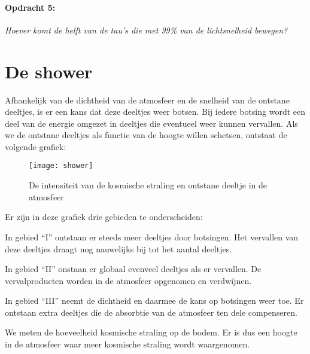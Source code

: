 \paragraph*{Opdracht 5:}

\emph{Hoever komt de helft van de tau's die met 99\% van de lichtsnelheid
bewegen?}


\section{De shower}

Afhankelijk van de dichtheid van de atmosfeer en de snelheid van de
ontstane deeltjes, is er een kans dat deze deeltjes weer botsen. Bij
iedere botsing wordt een deel van de energie omgezet in deeltjes die
eventueel weer kunnen vervallen. Als we de ontstane deeltjes als functie
van de hoogte willen schetsen, ontstaat de volgende grafiek:

\begin{figure}[H]
\noindent \begin{centering}
\texttt{[image: shower]}
\par\end{centering}

\caption{De intensiteit van de kosmische straling en ontstane deeltje in de
atmosfeer}
\end{figure}


Er zijn in deze grafiek drie gebieden te onderscheiden:

In gebied ``I'' ontstaan er steeds meer deeltjes door botsingen.
Het vervallen van deze deeltjes draagt nog nauwelijks bij tot het
aantal deeltjes.

In gebied ``II'' onstaan er globaal evenveel deeltjes als er vervallen.
De vervalproducten worden in de atmosfeer opgenomen en verdwijnen.

In gebied ``III'' neemt de dichtheid en daarmee de kans op botsingen
weer toe. Er ontstaan extra deeltjes die de absorbtie van de atmosfeer
ten dele compenseren.

We meten de hoeveelheid kosmische straling op de bodem. Er is dus
een hoogte in de atmosfeer waar meer kosmische straling wordt waargenomen.


